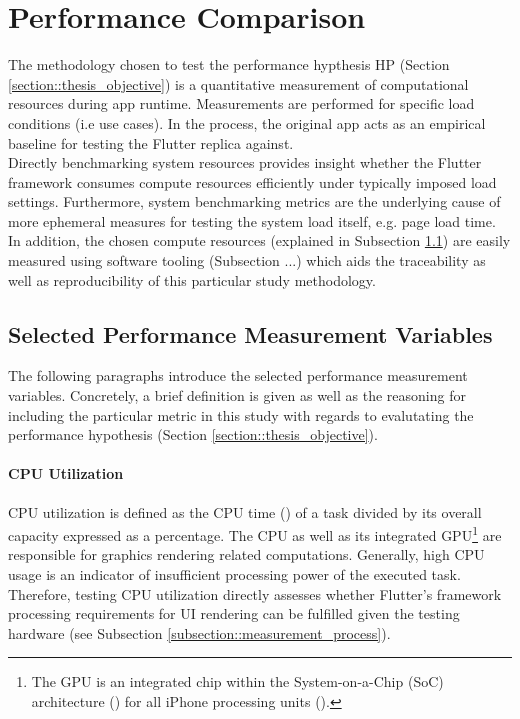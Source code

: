 \section{Performance Comparison} \label{section::performance_comparison_design}
The methodology chosen to test the performance hypthesis HP (Section \ref{section::thesis_objective}) is a quantitative
measurement of computational resources during app runtime. Measurements are performed for
specific load conditions (i.e use cases). In the process, the original app acts as an empirical
baseline for testing the Flutter replica against.\\
Directly benchmarking system resources provides insight whether the Flutter framework consumes
compute resources efficiently under typically imposed load settings. Furthermore, system
benchmarking metrics are the underlying cause of more ephemeral measures for testing the
system load itself, e.g. page load time. In addition, the chosen compute resources (explained
in Subsection \ref{subsection::selected_measurement_variables}) are easily measured using software tooling (Subsection ...) which aids the
traceability as well as reproducibility of this particular study methodology.

\subsection{Selected Performance Measurement Variables} \label{subsection::selected_measurement_variables}
The following paragraphs introduce the selected performance measurement variables. Concretely,
a brief definition is given as well as the reasoning for including the particular metric in
this study with regards to evalutating the performance hypothesis (Section \ref{section::thesis_objective}).

\paragraph*{CPU Utilization}\hfill \break
CPU utilization is defined as the CPU time (\cite{FSF1988}) of a task
divided by its overall capacity expressed as a percentage. The CPU as well as its integrated GPU\footnote{The GPU is an integrated chip within the System-on-a-Chip (SoC) architecture (\cite{Martin2001}) for all
iPhone processing units (\cite{WikiChip2020}).}
are responsible for graphics rendering related computations. Generally, high CPU usage is an
indicator of insufficient processing power of the executed task. Therefore, testing CPU utilization
directly assesses whether Flutter’s framework processing requirements for UI rendering can be
fulfilled given the testing hardware (see Subsection \ref{subsection::measurement_process}).

